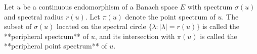 Let $u$ be a continuous endomorphism of a Banach space $E$ with spectrum $\sigma(u)$ and spectral radius $r(u)$. Let $\pi(u)$ denote the point spectrum of $u$. The subset of $\sigma(u)$ located on the spectral circle $\{\lambda: |\lambda| = r(u)\}$ is called the **peripheral spectrum** of $u$, and its intersection with $\pi(u)$ is called the **peripheral point spectrum** of $u$.
